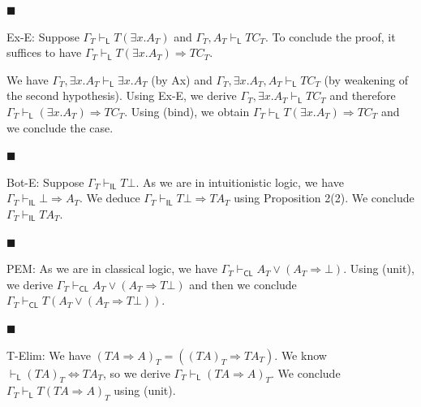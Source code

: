  
\par\noindent  $\blacksquare$ 
 
Ex-E: Suppose $\Gamma_{T}\vdash_{\mathsf{L}}T({\exists}x.A_{T})$ and $\Gamma_{T},A_{T}\vdash_{\mathsf{L}}TC_{T}$. To conclude the proof, it suffices to have $\Gamma_{T}\vdash_{\mathsf{L}}T({\exists}x.A_{T})\mathbin{\Rightarrow}TC_{T}$.\par
 
 
 
We have $\Gamma_{T},{\exists}x.A_{T}\vdash_{\mathsf{L}}{\exists}x.A_{T}$ (by Ax) and $\Gamma_{T},{\exists}x.A_{T},A_{T}\vdash_{\mathsf{L}}TC_{T}$ (by weakening of the second hypothesis). Using Ex-E, we derive $\Gamma_{T},{\exists}x.A_{T}\vdash_{\mathsf{L}}TC_{T}$ and therefore $\Gamma_{T}\vdash_{\mathsf{L}}({\exists}x.A_{T})\mathbin{\Rightarrow}TC_{T}$. Using (bind), we obtain $\Gamma_{T}\vdash_{\mathsf{L}}T({\exists}x.A_{T})\mathbin{\Rightarrow}TC_{T}$ and we conclude the case.\par
 
 
 
\par\noindent  $\blacksquare$ 
 
Bot-E: Suppose $\Gamma_{T}\vdash_{\mathsf{IL}}T\bot$. As we are in intuitionistic logic, we have $\Gamma_{T}\vdash_{\mathsf{IL}}\bot\mathbin{\Rightarrow}A_{T}$. We deduce $\Gamma_{T}\vdash_{\mathsf{IL}}T\bot\mathbin{\Rightarrow}TA_{T}$ using Proposition 2(2). We conclude $\Gamma_{T}\vdash_{\mathsf{IL}}TA_{T}$.\par
 
 
 
\par\noindent  $\blacksquare$ 
 
PEM: As we are in classical logic, we have $\Gamma_{T}\vdash_{\mathsf{CL}}A_{T}\mathbin{\vee}(A_{T}\mathbin{\Rightarrow}\bot)$. Using (unit), we derive $\Gamma_{T}\vdash_{\mathsf{CL}}A_{T}\mathbin{\vee}(A_{T}\mathbin{\Rightarrow}T\bot)$ and then we conclude $\Gamma_{T}\vdash_{\mathsf{CL}}T(A_{T}\mathbin{\vee}(A_{T}\mathbin{\Rightarrow}T\bot))$.\par
 
 
 
\par\noindent  $\blacksquare$ 
 
T-Elim: We have $(TA\mathbin{\Rightarrow}A)_{T}=((TA)_{T}\mathbin{\Rightarrow}TA_{T})$. We know $\vdash_{\mathsf{L}}(TA)_{T}\Leftrightarrow TA_{T}$, so we derive $\Gamma_{T}\vdash_{\mathsf{L}}(TA\mathbin{\Rightarrow}A)_{T}$. We conclude $\Gamma_{T}\vdash_{\mathsf{L}}T(TA\mathbin{\Rightarrow}A)_{T}$ using (unit).\par
 
